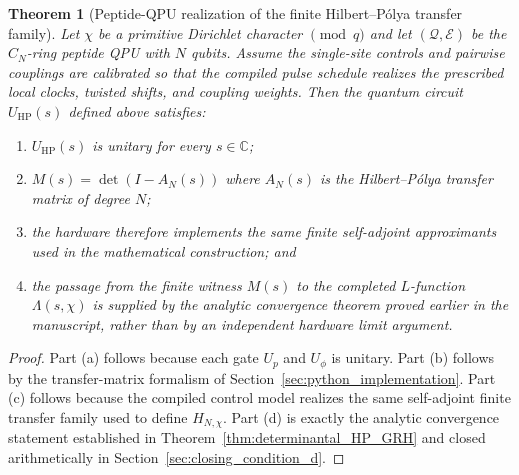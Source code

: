 \documentclass[11pt,oneside]{amsbook}
\numberwithin{equation}{section}
\theoremstyle{plain}
\newtheorem{theorem}{Theorem}[section]
\theoremstyle{definition}
\theoremstyle{remark}
\begin{document}
\begin{theorem}[Peptide-QPU realization of the finite Hilbert--P\'olya transfer family]
\label{thm:peptide_HP}
Let $\chi$ be a primitive Dirichlet character $\pmod{q}$ and let
$(\mathcal{Q}, \mathcal{E})$ be the $C_N$-ring peptide QPU with $N$ qubits.
Assume the single-site controls and pairwise couplings are calibrated so that
the compiled pulse schedule realizes the prescribed local clocks, twisted
shifts, and coupling weights.  Then the quantum circuit $U_{\text{HP}}(s)$
defined above satisfies:
\begin{enumerate}[label={\rm(\alph*)}]
\item $U_{\text{HP}}(s)$ is unitary for every $s \in \mathbb{C}$;
\item $M(s) = \det(I - A_N(s))$ where $A_N(s)$ is the Hilbert--P\'olya
      transfer matrix of degree $N$;
\item the hardware therefore implements the same finite self-adjoint
      approximants used in the mathematical construction; and
\item the passage from the finite witness $M(s)$ to the completed
      $L$-function $\Lambda(s, \chi)$ is supplied by the analytic convergence
      theorem proved earlier in the manuscript, rather than by an independent
      hardware limit argument.
\end{enumerate}
\end{theorem}

\begin{proof}
Part (a) follows because each gate $U_p$ and $U_\phi$ is unitary.  Part (b)
follows by the transfer-matrix formalism of Section~\ref{sec:python_implementation}.
Part (c) follows because the compiled control model realizes the same
self-adjoint finite transfer family used to define $H_{N,\chi}$.
Part (d) is exactly the analytic convergence statement established in
Theorem~\ref{thm:determinantal_HP_GRH} and closed arithmetically in
Section~\ref{sec:closing_condition_d}.
\end{proof}
\end{document}
